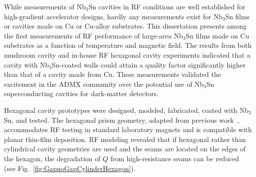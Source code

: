 While measurements of Nb$_3$Sn cavities in RF conditions are well established for high-gradient accelerator designs, hardly any measurements exist for Nb$_3$Sn films or cavities made on Cu or Cu-alloy substrates. This dissertation presents among the first measurements of RF performance of large-area Nb$_3$Sn films made on Cu substrates as a function of temperature and magnetic field. The results from both mushroom cavity and in-house RF hexagonal cavity experiments indicated that a cavity with Nb$_3$Sn-coated walls could attain a quality factor significantly higher than that of a cavity made from Cu. These measurements validated the excitement in the ADMX community over the potential use of Nb$_3$Sn superconducting cavities for dark-matter detectors.

Hexagonal cavity prototypes were designed, modeled, fabricated, coated with Nb$_3$Sn, and tested. The hexagonal prism geometry, adapted from previous work~\cite{Ahn:2021fgb, Braine:2024nzi}, accommodates RF testing in standard laboratory magnets and is compatible with planar thin-film deposition. RF modeling revealed that if hexagonal rather than cylindrical cavity geometries are used and the seams are located on the edges of the hexagon, the degradation of $Q$ from high-resistance seams can be reduced (see Fig.~\ref{fig:GapnoGapCylinderHexagon}).





